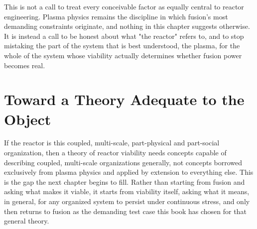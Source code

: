 This is not a call to treat every conceivable factor as equally central to reactor engineering. Plasma physics remains the discipline in which fusion's most demanding constraints originate, and nothing in this chapter suggests otherwise. It is instead a call to be honest about what "the reactor" refers to, and to stop mistaking the part of the system that is best understood, the plasma, for the whole of the system whose viability actually determines whether fusion power becomes real.

\section{Toward a Theory Adequate to the Object}

If the reactor is this coupled, multi-scale, part-physical and part-social organization, then a theory of reactor viability needs concepts capable of describing coupled, multi-scale organizations generally, not concepts borrowed exclusively from plasma physics and applied by extension to everything else. This is the gap the next chapter begins to fill. Rather than starting from fusion and asking what makes it viable, it starts from viability itself, asking what it means, in general, for any organized system to persist under continuous stress, and only then returns to fusion as the demanding test case this book has chosen for that general theory.
